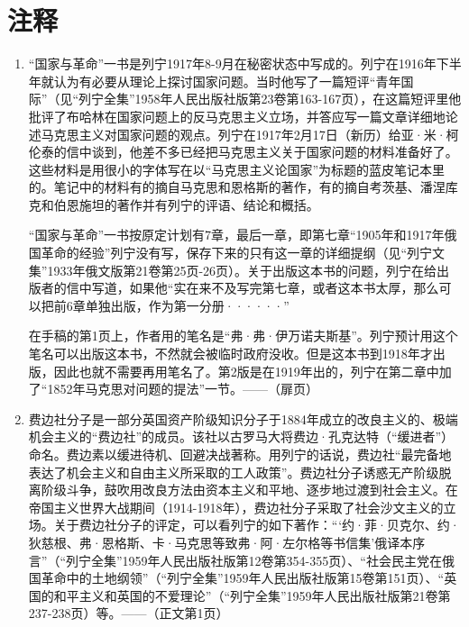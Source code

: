 \chapter{注\qquad 释} %

\small

\begin{enumerate}
	\item {\kaishu “国家与革命”}\quad 一书是列宁1917年8-9月在秘密状态中写成的。列宁在1916年下半年就认为有必要从理论上探讨国家问题。当时他写了一篇短评“青年国际”（见“列宁全集”1958年人民出版社版第23卷第163-167页），在这篇短评里他批评了布哈林在国家问题上的反马克思主义立场，并答应写一篇文章详细地论述马克思主义对国家问题的观点。列宁在1917年2月17日（新历）给亚·米·柯伦泰的信中谈到，他差不多已经把马克思主义关于国家问题的材料准备好了。这些材料是用很小的字体写在以“马克思主义论国家”为标题的蓝皮笔记本里的。笔记中的材料有的摘自马克思和恩格斯的著作，有的摘自考茨基、潘涅库克和伯恩施坦的著作并有列宁的评语、结论和概括。
	
	“国家与革命”一书按原定计划有7章，最后一章，即第七章“1905年和1917年俄国革命的经验”列宁没有写，保存下来的只有这一章的详细提纲（见“列宁文集”1933年俄文版第21卷第25页-26页）。关于出版这本书的问题，列宁在给出版者的信中写道，如果他“实在来不及写完第七章，或者这本书太厚，那么可以把前6章单独出版，作为第一分册······”
	
	在手稿的第1页上，作者用的笔名是“弗·弗·伊万诺夫斯基”。列宁预计用这个笔名可以出版这本书，不然就会被临时政府没收。但是这本书到1918年才出版，因此也就不需要再用笔名了。第2版是在1919年出的，列宁在第二章中加了“1852年马克思对问题的提法”一节。——（扉页）
	
	\item {\kaishu 费边社分子}\quad 是一部分英国资产阶级知识分子于1884年成立的改良主义的、极端机会主义的“费边社”的成员。该社以古罗马大将费边·孔克达特（“缓进者”）命名。费边素以缓进待机、回避决战著称。用列宁的话说，费边社“最完备地表达了机会主义和自由主义所采取的工人政策”。费边社分子诱惑无产阶级脱离阶级斗争，鼓吹用改良方法由资本主义和平地、逐步地过渡到社会主义。在帝国主义世界大战期间（1914-1918年），费边社分子采取了社会沙文主义的立场。关于费边社分子的评定，可以看列宁的如下著作：“‘约·菲·贝克尔、约·狄慈根、弗·恩格斯、卡·马克思等致弗·阿·左尔格等书信集’俄译本序言”（“列宁全集”1959年人民出版社版第12卷第354-355页）、“社会民主党在俄国革命中的土地纲领”（“列宁全集”1959年人民出版社版第15卷第151页）、“英国的和平主义和英国的不爱理论”（“列宁全集”1959年人民出版社版第21卷第237-238页）等。——（正文第1页）
	

\end{enumerate}
